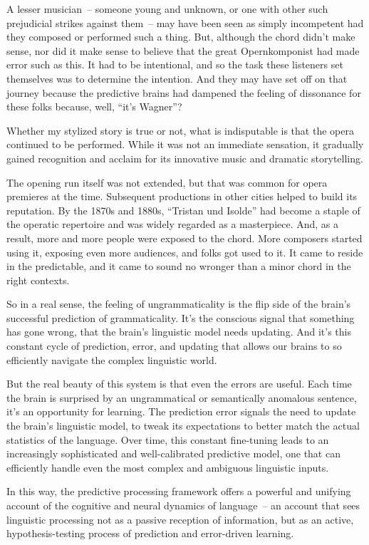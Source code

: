 A lesser musician~-- someone young and unknown, or one with other such prejudicial strikes against them~-- may have been seen as simply incompetent had they composed or performed such a thing. But, although the chord didn't make sense, nor did it make sense to believe that the great Opernkomponist had made error such as this. It had to be intentional, and so the task these listeners set themselves was to determine the intention. And they may have set off on that journey because the predictive brains had dampened the feeling of dissonance for these folks because, well, ``it's Wagner''?

Whether my stylized story is true or not, what is indisputable is that the opera continued to be performed. While it was not an immediate sensation, it gradually gained recognition and acclaim for its innovative music and dramatic storytelling.

The opening run itself was not extended, but that was common for opera premieres at the time. Subsequent productions in other cities helped to build its reputation. By the 1870s and 1880s, ``Tristan und Isolde'' had become a staple of the operatic repertoire and was widely regarded as a masterpiece. And, as a result, more and more people were exposed to the chord. More composers started using it, exposing even more audiences, and folks got used to it. It came to reside in the predictable, and it came to sound no wronger than a minor chord in the right contexts.

\bigskip

So in a real sense, the feeling of ungrammaticality is the flip side of the brain's successful prediction of grammaticality. It's the conscious signal that something has gone wrong, that the brain's linguistic model needs updating. And it's this constant cycle of prediction, error, and updating that allows our brains to so efficiently navigate the complex linguistic world.

But the real beauty of this system is that even the errors are useful. Each time the brain is surprised by an ungrammatical or semantically anomalous sentence, it's an opportunity for learning. The prediction error signals the need to update the brain's linguistic model, to tweak its expectations to better match the actual statistics of the language. Over time, this constant fine-tuning leads to an increasingly sophisticated and well-calibrated predictive model, one that can efficiently handle even the most complex and ambiguous linguistic inputs.

In this way, the predictive processing framework offers a powerful and unifying account of the cognitive and neural dynamics of language~-- an account that sees linguistic processing not as a passive reception of information, but as an active, hypothesis-testing process of prediction and error-driven learning.

